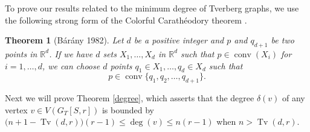 \documentclass[11pt,a4paper]{article}
\theoremstyle{plain}
\newtheorem{theorem}{Theorem}[section]
\newtheorem{lemma}[theorem]{Lemma}
\theoremstyle{definition}
\newcommand{\rr}{\mathds{R}}
\newcommand{\conv}{\operatorname{conv}}
\newcommand{\tv}{\operatorname{Tv}}
\begin{document}



To prove our results related to the minimum degree of Tverberg graphs, we use the following strong form of the Colorful Carath\'eodory theorem \cite{Barany1982}.

\begin{theorem}[B\'ar\'any 1982]\label{caratheodory}
    Let $d$ be a positive integer and $p$ and $q_{d+1}$ be two points in $\rr^d$.  If we have $d$ sets $X_1, \dots, X_d$ in $\rr^d$ such that $p \in \conv (X_i)$ for $i=1,\dots, d$, we can choose $d$ points $q_1 \in X_1, \dots, q_d \in X_d $ such that
    \[
p \in \conv \{q_1, q_2, \dots, q_{d+1}\}.
    \]
\end{theorem}

Next we will prove Theorem \ref{degree}, which asserts that the degree $\delta(v)$ of any vertex $v\in V(G_T[S,r])$ is bounded by $\Big(n+1 - \tv(d,r) \Big)(r-1)\leq \operatorname{deg}(v) \leq n(r-1)$ when $n>\tv(d,r)$.
\end{document}
